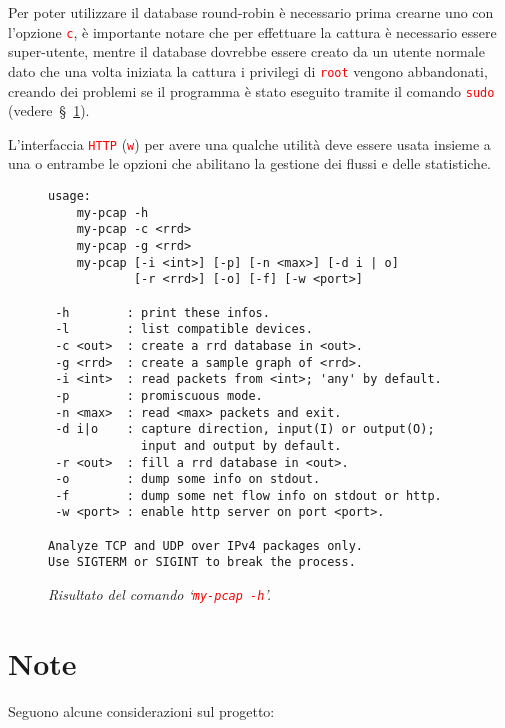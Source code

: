 \documentclass[a4paper,11pt]{article}
\newcommand\code[1]{\textcolor{red}{\texttt{#1}}}
\begin{document}
Per poter utilizzare il database round-robin è necessario prima
crearne uno con l'opzione \code{c}, è importante notare che per
effettuare la cattura è necessario essere super-utente, mentre il
database dovrebbe essere creato da un utente normale dato che una
volta iniziata la cattura i privilegi di \code{root} vengono
abbandonati, creando dei problemi se il programma è stato eseguito
tramite il comando \code{sudo} (vedere~§~\ref{par:notes}).

L'interfaccia \code{HTTP} (\code{w}) per avere una qualche utilità
deve essere usata insieme a una o entrambe le opzioni che abilitano la
gestione dei flussi e delle statistiche.

\begin{figure}
  \centering
\begin{verbatim}
usage:
    my-pcap -h
    my-pcap -c <rrd>
    my-pcap -g <rrd>
    my-pcap [-i <int>] [-p] [-n <max>] [-d i | o]
            [-r <rrd>] [-o] [-f] [-w <port>]

 -h        : print these infos.
 -l        : list compatible devices.
 -c <out>  : create a rrd database in <out>.
 -g <rrd>  : create a sample graph of <rrd>.
 -i <int>  : read packets from <int>; 'any' by default.
 -p        : promiscuous mode.
 -n <max>  : read <max> packets and exit.
 -d i|o    : capture direction, input(I) or output(O);
             input and output by default.
 -r <out>  : fill a rrd database in <out>.
 -o        : dump some info on stdout.
 -f        : dump some net flow info on stdout or http.
 -w <port> : enable http server on port <port>.

Analyze TCP and UDP over IPv4 packages only.
Use SIGTERM or SIGINT to break the process.
\end{verbatim}
  \caption{\small\it Risultato del comando `\code{my-pcap~-h}'.}
  \label{fig:usage}
\end{figure}

\section{Note} \label{par:notes}
Seguono alcune considerazioni sul progetto:
\end{document}
